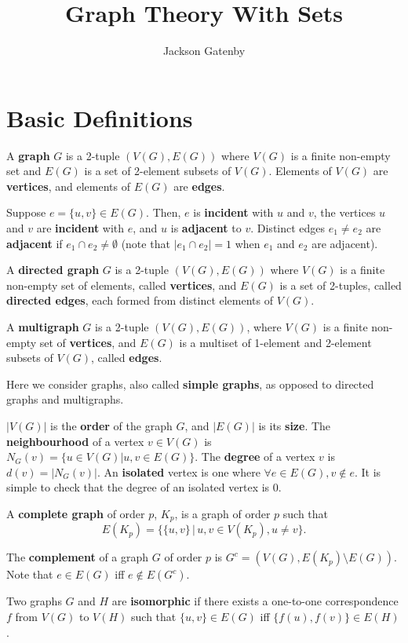 \documentclass[a4paper,12pt]{article}
\begin{document}
\title{Graph Theory With Sets}
\author{Jackson Gatenby}
\maketitle

\section{Basic Definitions}

A {\bf graph} $G$ is a 2-tuple $(V(G), E(G))$ where $V(G)$ is a finite non-empty
set and $E(G)$ is a set of 2-element subsets of $V(G)$. Elements of $V(G)$ are
{\bf vertices}, and elements of $E(G)$ are {\bf edges}.

Suppose $e = \{u, v\} \in E(G)$. Then, $e$ is {\bf incident} with $u$ and $v$, the
vertices $u$ and $v$ are {\bf incident} with $e$, and $u$ is {\bf adjacent}
to $v$. Distinct edges $e_1 \neq e_2$ are {\bf adjacent} if $e_1 \cap e_2 \neq
\emptyset$ (note that $|e_1 \cap e_2| = 1$ when $e_1$ and $e_2$ are adjacent).

A {\bf directed graph} $G$ is a 2-tuple $(V(G), E(G))$ where $V(G)$ is a finite
non-empty set of elements, called {\bf vertices}, and $E(G)$ is a set of
2-tuples, called {\bf directed edges}, each formed from distinct
elements of $V(G)$.

A {\bf multigraph} $G$ is a 2-tuple $(V(G), E(G))$, where $V(G)$ is a finite
non-empty set of {\bf vertices}, and $E(G)$ is a multiset of 1-element and
2-element subsets of $V(G)$, called {\bf edges}.

Here we consider graphs, also called {\bf simple graphs}, as opposed to
directed graphs and multigraphs.

$|V(G)|$ is the {\bf order} of the graph $G$, and $|E(G)|$ is its {\bf size}.
The {\bf neighbourhood} of a vertex $v \in V(G)$ is
$N_G(v) = \{u \in V(G) | {u,v} \in E(G)\}$.
The {\bf degree} of a vertex $v$ is $d(v) = |N_G(v)|$.
An {\bf isolated} vertex is one where $\forall e \in E(G), v \not\in e$. It is
simple to check that the degree of an isolated vertex is 0.

A {\bf complete graph} of order $p$, $K_p$, is a graph of order $p$ such that
\[ E(K_p) = \{\{u, v\} \,|\, u, v \in V(K_p), u \neq v\}. \]

The {\bf complement} of a graph $G$ of order $p$ is
$G^c = (V(G), E(K_p) \setminus E(G))$. Note that $e \in E(G)$ iff $e \not\in E(G^c)$.

Two graphs $G$ and $H$ are {\bf isomorphic} if there exists a one-to-one
correspondence $f$ from $V(G)$ to $V(H)$ such that $\{u, v\} \in E(G)$ iff
$\{f(u), f(v)\} \in E(H)$.
\end{document}

